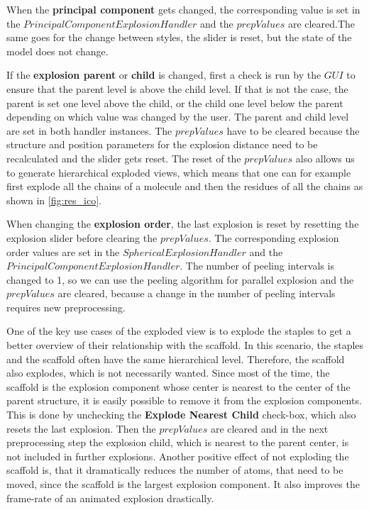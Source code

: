 \documentclass[draft,final]{vutinfth} %
\begin{document}
\par When the \textbf{principal component} gets changed, the corresponding value is set in the $PrincipalComponentExplosionHandler$ and the $prepValues$ are cleared.The same goes for the change between styles, the slider is reset, but the state of the model does not change.

\par If the \textbf{explosion parent} or \textbf{child} is changed, first a check is run by the $GUI$ to ensure that the parent level is above the child level. If that is not the case, the parent is set one level above the child, or the child one level below the parent depending on which value was changed by the user. The parent and child level are set in both handler instances. The $prepValues$ have to be cleared because the structure and position parameters for the explosion distance need to be recalculated and the slider gets reset. The reset of the $prepValues$ also allows us to generate hierarchical exploded views, which means that one can for example first explode all the chains of a molecule and then the residues of all the chains as shown in \autoref{fig:res_ico}.

\par When changing the \textbf{explosion order}, the last explosion is reset by resetting the explosion slider before clearing the $prepValues$. The corresponding explosion order values are set in the $SphericalExplosionHandler$ and the $PrincipalComponentExplosionHandler$. The number of peeling intervals is changed to 1, so we can use the peeling algorithm for parallel explosion and the $prepValues$ are cleared, because a change in the number of peeling intervals requires new preprocessing.

\par One of the key use cases of the exploded view is to explode the staples to get a better overview of their relationship with the scaffold. In this scenario, the staples and the scaffold often have the same hierarchical level. Therefore, the scaffold also explodes, which is not necessarily wanted. Since most of the time, the scaffold is the explosion component whose center is nearest to the center of the parent structure, it is easily possible to remove it from the explosion components. This is done by unchecking the \textbf{Explode Nearest Child} check-box, which also resets the last explosion. Then the $prepValues$ are cleared and in the next preprocessing step the explosion child, which is nearest to the parent center, is not included in further explosions. Another positive effect of not exploding the scaffold is, that it dramatically reduces the number of atoms, that need to be moved, since the scaffold is the largest explosion component. It also improves the frame-rate of an animated explosion drastically.
\end{document}
